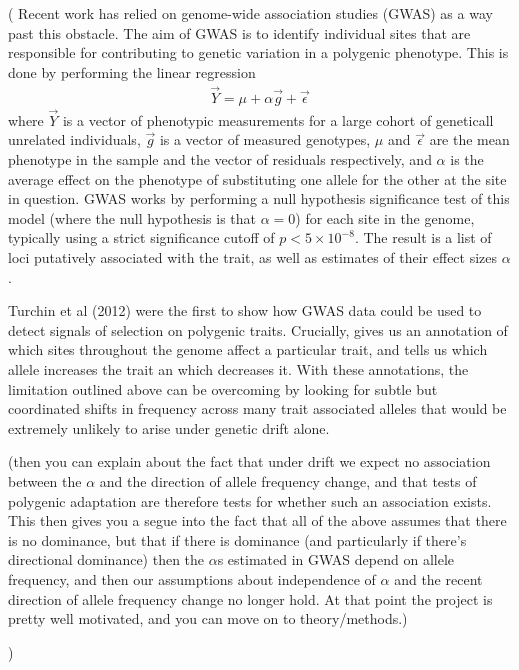 \documentclass[a4paper,12pt]{article}
\newcommand{\jb}[1]{{\color{blue} (#1)} }
\begin{document}
\jb{
  Recent work has relied on genome-wide association studies (GWAS) as a way past this obstacle.
  The aim of GWAS is to identify individual sites that are responsible for contributing to genetic
  variation in a polygenic phenotype. This is done by performing the linear regression
  \begin{align}
    \vec{Y} = \mu + \alpha \vec{g} + \vec{\epsilon}
  \end{align}
  where $\vec{Y}$ is a vector of phenotypic measurements for a large cohort of geneticall unrelated individuals,
  $\vec{g}$ is a vector of measured genotypes, $\mu$ and $\vec{\epsilon}$ are the mean phenotype in the sample
  and the vector of residuals respectively, and $\alpha$ is the average effect on the phenotype of
  substituting one allele for the other at the site in question. GWAS works by performing a null hypothesis
  significance test of this model (where the null hypothesis is that $\alpha = 0$) for each site in the genome,
  typically using a strict significance cutoff of $p<5\times 10^{-8}$. The result is a list of loci
  putatively associated with the trait, as well as estimates of their effect sizes $\alpha$.

  Turchin et al (2012) were the first to show how GWAS data could be used to detect signals of selection on
  polygenic traits. Crucially, gives us an annotation of which sites throughout the genome affect a
  particular trait, and tells us which allele increases the trait an which decreases it. With these annotations,
  the limitation outlined above can be overcoming by looking for subtle but coordinated shifts in
  frequency across many trait associated alleles that would be extremely unlikely to arise under
  genetic drift alone.

  (then you can explain about the fact that under drift we expect no association between the $\alpha$
  and the direction of allele frequency change, and that tests of polygenic adaptation are therefore
  tests for whether such an association exists. This then gives you a segue into the fact that all of the above
  assumes that there is no dominance, but that if there is dominance (and particularly if there's directional
  dominance) then the $\alpha$s estimated in GWAS depend on allele frequency, and then our assumptions about
  independence of $\alpha$ and the recent direction of allele frequency change no longer hold. At that point
  the project is pretty well motivated, and you can move on to theory/methods.)
  
}
\end{document}
